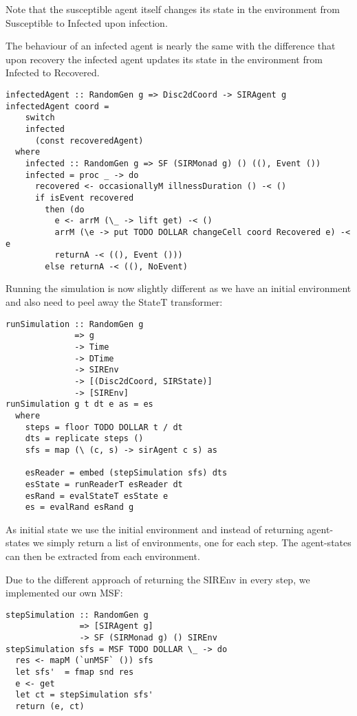 Note that the susceptible agent itself changes its state in the environment from Susceptible to Infected upon infection.

The behaviour of an infected agent is nearly the same with the difference that upon recovery the infected agent updates its state in the environment from Infected to Recovered.

\begin{verbatim}
infectedAgent :: RandomGen g => Disc2dCoord -> SIRAgent g
infectedAgent coord = 
    switch
    infected 
      (const recoveredAgent)
  where
    infected :: RandomGen g => SF (SIRMonad g) () ((), Event ())
    infected = proc _ -> do
      recovered <- occasionallyM illnessDuration () -< ()
      if isEvent recovered
        then (do
          e <- arrM (\_ -> lift get) -< ()
          arrM (\e -> put TODO DOLLAR changeCell coord Recovered e) -< e
          returnA -< ((), Event ()))
        else returnA -< ((), NoEvent)
\end{verbatim}

Running the simulation is now slightly different as we have an initial environment and also need to peel away the StateT transformer:
\begin{verbatim}
runSimulation :: RandomGen g
              => g 
              -> Time 
              -> DTime 
              -> SIREnv
              -> [(Disc2dCoord, SIRState)] 
              -> [SIREnv]
runSimulation g t dt e as = es
  where
    steps = floor TODO DOLLAR t / dt
    dts = replicate steps ()
    sfs = map (\ (c, s) -> sirAgent c s) as

    esReader = embed (stepSimulation sfs) dts
    esState = runReaderT esReader dt
    esRand = evalStateT esState e
    es = evalRand esRand g
\end{verbatim}

As initial state we use the initial environment and instead of returning agent-states we simply return a list of environments, one for each step. The agent-states can then be extracted from each environment.

Due to the different approach of returning the SIREnv in every step, we implemented our own MSF:
\begin{verbatim}
stepSimulation :: RandomGen g
               => [SIRAgent g]
               -> SF (SIRMonad g) () SIREnv
stepSimulation sfs = MSF TODO DOLLAR \_ -> do
  res <- mapM (`unMSF` ()) sfs
  let sfs'  = fmap snd res
  e <- get
  let ct = stepSimulation sfs'
  return (e, ct) 
\end{verbatim}


